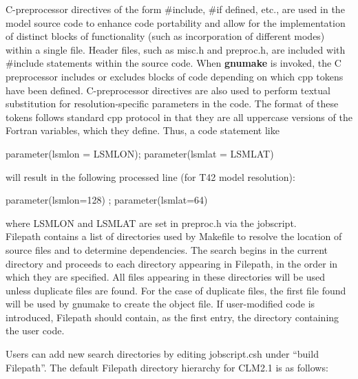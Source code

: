 C-preprocessor directives of the form \#include, \#if defined, etc.,
are used in the model source code to enhance code portability and
allow for the implementation of distinct blocks of functionality (such
as incorporation of different modes) within a single file.  Header
files, such as misc.h and preproc.h, are included with \#include
statements within the source code. When {\bf gnumake} is invoked, the
C preprocessor includes or excludes blocks of code depending on which
cpp tokens have been defined. C-preprocessor directives are also used
to perform textual substitution for resolution-specific parameters in
the code. The format of these tokens follows standard cpp protocol in
that they are all uppercase versions of the Fortran variables, which
they define. Thus, a code statement like
\begin{description}
\item [parameter(lsmlon = LSMLON); parameter(lsmlat = LSMLAT)] 
\end{description}
will result in the following processed line (for T42 model resolution):
\begin{description}
\item[parameter(lsmlon=128) ; parameter(lsmlat=64)] 
\end{description}
where LSMLON and LSMLAT are set in preproc.h via the jobscript. \\

Filepath contains a list of directories used by Makefile to
resolve the location of source files and to determine dependencies.
The search begins in the current directory and proceeds to each
directory appearing in Filepath, in the order in which they are
specified.  All files appearing in these directories will be used
unless duplicate files are found.  For the case of duplicate files,
the first file found will be used by gnumake to create the object
file.  If user-modified code is introduced, Filepath should contain,
as the first entry, the directory containing the user code.

Users can add new search directories by editing jobscript.csh under
``build Filepath''.  The default Filepath directory hierarchy for
CLM2.1 is as follows:

